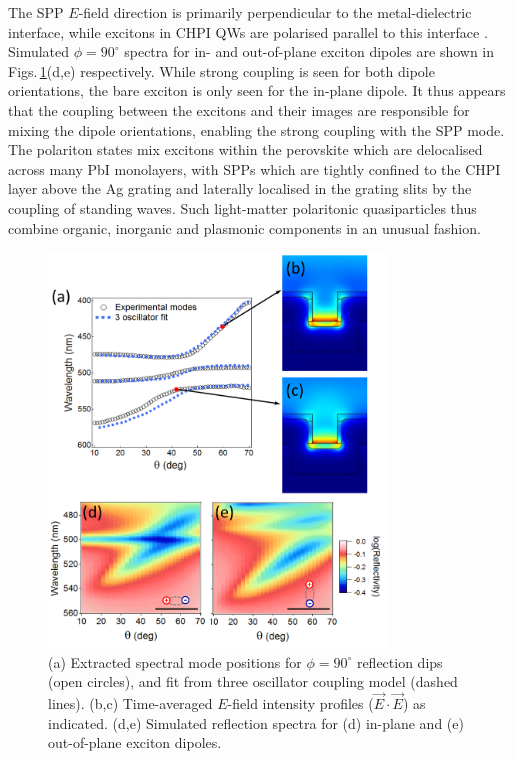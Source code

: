 The SPP $E$-field direction is primarily perpendicular to the metal-dielectric interface, while excitons in CHPI QWs are polarised parallel to this interface \cite{Pradeesh2009b, Mitzi2001b}.  Simulated $\phi=90^{\circ}$ spectra for in- and out-of-plane exciton dipoles are shown in Figs.\,\ref{7Fig18}(d,e) respectively. While strong coupling is seen for both dipole orientations, the bare exciton is only seen for the in-plane dipole. It thus appears that the coupling between the excitons and their images are responsible for mixing the dipole orientations, enabling the strong coupling with the SPP mode. The polariton states mix excitons within the perovskite which are delocalised across many PbI monolayers, with SPPs which are tightly confined to the CHPI layer above the Ag grating and laterally localised in the grating slits by the coupling of standing waves. Such light-matter polaritonic quasiparticles thus combine organic, inorganic and plasmonic components in an unusual fashion.
\begin{figure}[h!] 
\centering    
\includegraphics[width=0.8\textwidth]{Fig18}
\caption{(a) Extracted spectral mode positions for $\phi=90^{\circ}$ reflection dips (open circles), and fit from three oscillator coupling model (dashed lines). (b,c) Time-averaged $E$-field intensity profiles ($\vec{E}\cdot\vec{E}$) as indicated. (d,e) Simulated reflection spectra for (d) in-plane and (e) out-of-plane exciton dipoles.}
\label{7Fig18}
\end{figure}

